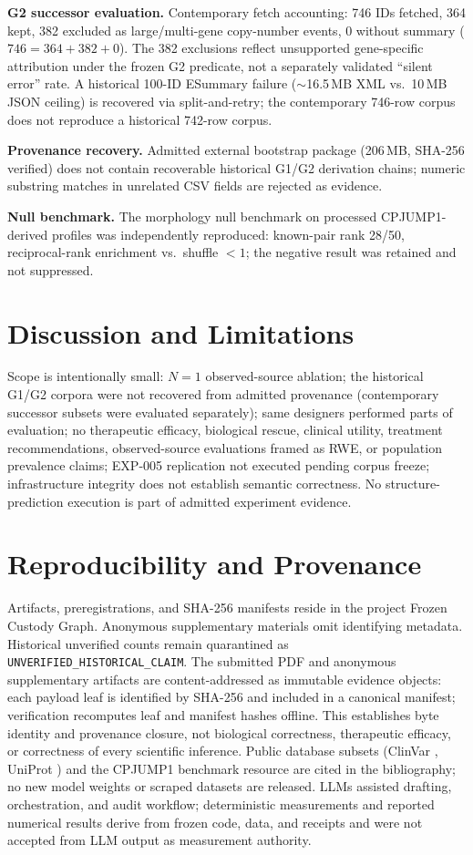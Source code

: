 \documentclass{article}
\begin{document}
\textbf{G2 successor evaluation.} Contemporary fetch accounting: 746 IDs fetched, 364 kept, 382 excluded as large/multi-gene copy-number events, 0 without summary ($746{=}364{+}382{+}0$). The 382 exclusions reflect unsupported gene-specific attribution under the frozen G2 predicate, not a separately validated ``silent error'' rate. A historical 100-ID ESummary failure ($\sim$16.5\,MB XML vs.\ 10\,MB JSON ceiling) is recovered via split-and-retry; the contemporary 746-row corpus does not reproduce a historical 742-row corpus.

\textbf{Provenance recovery.} Admitted external bootstrap package (206\,MB, SHA-256 verified) does not contain recoverable historical G1/G2 derivation chains; numeric substring matches in unrelated CSV fields are rejected as evidence.

\textbf{Null benchmark.} The morphology null benchmark on processed CPJUMP1-derived profiles \cite{cpjump1_2024} was independently reproduced: known-pair rank 28/50, reciprocal-rank enrichment vs.\ shuffle $<1$; the negative result was retained and not suppressed.

\section{Discussion and Limitations}
Scope is intentionally small: $N{=}1$ observed-source ablation; the historical G1/G2 corpora were not recovered from admitted provenance (contemporary successor subsets were evaluated separately); same designers performed parts of evaluation; no therapeutic efficacy, biological rescue, clinical utility, treatment recommendations, observed-source evaluations framed as RWE, or population prevalence claims; EXP-005 replication not executed pending corpus freeze; infrastructure integrity does not establish semantic correctness. No structure-prediction execution is part of admitted experiment evidence.

\section{Reproducibility and Provenance}
Artifacts, preregistrations, and SHA-256 manifests reside in the project Frozen Custody Graph. Anonymous supplementary materials omit identifying metadata. Historical unverified counts remain quarantined as \texttt{UNVERIFIED\_HISTORICAL\_CLAIM}. The submitted PDF and anonymous supplementary artifacts are content-addressed as immutable evidence objects: each payload leaf is identified by SHA-256 and included in a canonical manifest; verification recomputes leaf and manifest hashes offline. This establishes byte identity and provenance closure, not biological correctness, therapeutic efficacy, or correctness of every scientific inference. Public database subsets (ClinVar \cite{clinvar2024}, UniProt \cite{uniprot2023}) and the CPJUMP1 benchmark resource \cite{cpjump1_2024} are cited in the bibliography; no new model weights or scraped datasets are released. LLMs assisted drafting, orchestration, and audit workflow; deterministic measurements and reported numerical results derive from frozen code, data, and receipts and were not accepted from LLM output as measurement authority.
\end{document}
